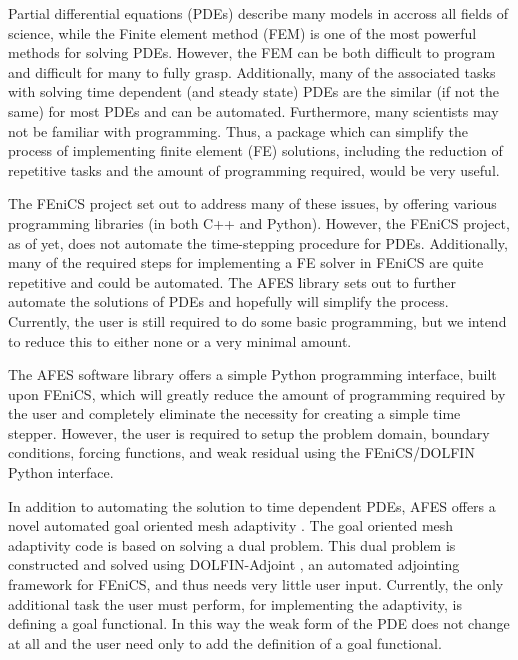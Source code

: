 Partial differential equations (PDEs) describe many models in accross all fields
of science, while the Finite element method (FEM) is one of the most powerful
methods for solving PDEs. However, the FEM can be both difficult to program and
difficult for many to fully grasp. Additionally, many of the associated tasks
with solving time dependent (and steady state) PDEs are the similar (if not the
same) for most PDEs and can be automated. Furthermore, many scientists may not
be familiar with programming. Thus, a package which can simplify the process of
implementing finite element (FE) solutions, including the reduction of
repetitive tasks and the amount of programming required, would be very useful.

The FEniCS project\cite{Alnae2011} set out to address many of these issues, by
offering various programming libraries (in both C++ and Python). However, the
FEniCS project, as of yet, does not automate the time-stepping procedure for
PDEs. Additionally, many of the required steps for implementing a FE solver in
FEniCS are quite repetitive and could be automated. The AFES library sets out to
further automate the solutions of PDEs and hopefully will simplify the process.
Currently, the user is still required to do some basic programming, but we
intend to reduce this to either none or a very minimal amount.

The AFES software library offers a simple Python programming interface, built
upon FEniCS, which will greatly reduce the amount of programming required by the
user and completely eliminate the necessity for creating a simple time stepper.
However, the user is required to setup the problem domain, boundary conditions,
forcing functions, and weak residual using the FEniCS/DOLFIN Python interface.

In addition to automating the solution to time dependent PDEs, AFES offers a
novel automated goal oriented mesh adaptivity \cite{Foster2014e, Jansson2014a,
Jansson2014b}.  The goal oriented mesh adaptivity code is based on solving a
dual problem.  This dual problem is constructed and solved using DOLFIN-Adjoint
\cite{Ham2012, Ferrell2014}, an automated adjointing framework for FEniCS, and
thus needs very little user input.  Currently, the only additional task the user
must perform, for implementing the adaptivity, is defining a goal functional.
In this way the weak form of the PDE does not change at all and the user need
only to add the definition of a goal functional.
